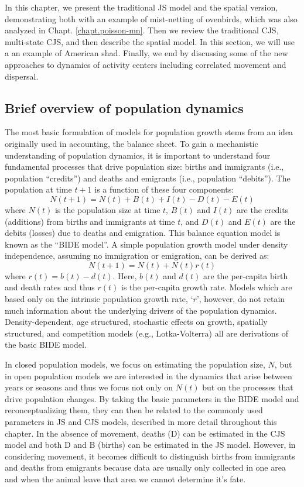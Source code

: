 In this chapter, we present the traditional JS model and
the spatial version, demonstrating both with an example of mist-netting of ovenbirds,
which was also analyzed in Chapt. \ref{chapt.poisson-mn}.  Then we review the
traditional CJS, multi-state CJS, and then describe the spatial model.  In this
section, we will use a an example of American shad.  Finally, we end by discussing
some of the new approaches to dynamics of activity centers including correlated
movement and dispersal.



\subsection{Brief overview of population dynamics}

The most basic formulation of models for population growth stems from
an idea originally used in accounting, the balance sheet.  To gain a
mechanistic understanding of population dynamics, it is important to
understand four fundamental processes that drive population size:
births and immigrants (i.e., population ``credits'') and deaths and
emigrants (i.e., population ``debits'').  The population at time $t+1$
is a function of these four components:
\[
N(t+1) = N(t) + B(t) + I(t) - D(t) - E(t)
\]
where $N(t)$ is the population size at time $t$, $B(t)$ and $I(t)$ are
the credits (additions) from births and immigrants at time $t$, and
$D(t)$ and $E(t)$ are the debits (losses) due to deaths and
emigration.  This balance equation model is known as the ``BIDE
model''.  A simple population growth model under density independence,
assuming no immigration or emigration, can be derived as:
\[
N(t+1) = N(t) + N(t)r(t)
\]
where $r(t) = b(t) - d(t)$.  Here, $b(t)$ and $d(t)$ are the
per-capita birth and death rates and thus $r(t)$ is the per-capita
growth rate. Models which are based only on the intrinsic population
growth rate, `$r$', however, do not retain much information about the
underlying drivers of the population dynamics.  Density-dependent, age
structured, stochastic effects on growth, spatially structured, and
competition models (e.g., Lotka-Volterra) all are derivations of the
basic BIDE model.

In closed population models, we focus on estimating the population
size, $N$, but in open population models we are interested in the
dynamics that arise between years or seasons and thus we focus not
only on $N(t)$ but on the processes that drive population changes.
By taking the basic parameters in the BIDE model and reconceptualizing
them, they can then be related to the commonly used parameters in JS
and CJS models, described in more detail throughout this chapter. In
the absence of movement, deaths (D) can be estimated in the CJS model
and both D and B (births) can be estimated in the JS model.  However,
in considering movement, it becomes difficult to distinguish births
from immigrants and deaths from emigrants because data are usually only 
collected in one area and when the animal leave that area we 
cannot determine it's fate.
 
